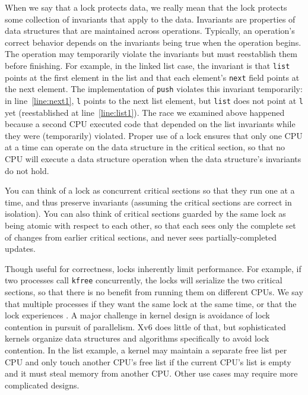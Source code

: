 When we say that a lock protects data, we really mean
that the lock protects some collection of invariants
that apply to the data.
Invariants are properties of data structures that
are maintained across operations.
Typically, an operation's correct behavior depends
on the invariants being true when the operation
begins.  The operation may temporarily violate
the invariants but must reestablish them before
finishing.
For example, in the linked list case, the invariant is that
\lstinline{list}
points at the first element in the list
and that each element's
\lstinline{next}
field points at the next element.
The implementation of
\lstinline{push}
violates this invariant temporarily: in line~\ref{line:next1},
\lstinline{l}
points
to the next list element, but
\lstinline{list}
does not point at
\lstinline{l}
yet (reestablished at line~\ref{line:list1}).
The race we examined above
happened because a second CPU executed
code that depended on the list invariants
while they were (temporarily) violated.
Proper use of a lock ensures that only one CPU at a time
can operate on the data structure in the critical section, so that
no CPU will execute a data structure operation when the 
data structure's invariants do not hold.

You can think of a lock as
concurrent critical sections so that they run one at a time,
and thus preserve invariants (assuming the critical sections
are correct in isolation).
You can also think of critical sections guarded by the same lock as being
atomic with respect to each other,
so that each sees only the complete set of
changes from earlier critical sections, and never sees
partially-completed updates.

Though useful for correctness, locks inherently
limit performance.  For example, if two processes call {\tt kfree}
concurrently, the locks will serialize the two critical sections,
so that there is no
benefit from running them on different CPUs.  We say that multiple
processes  if they want the same lock at the same
time, or that the lock experiences .  A major
challenge in kernel design is avoidance of lock contention
in pursuit of parallelism.  Xv6 does
little of that, but sophisticated kernels organize
data structures and algorithms specifically to avoid lock contention.  In the list
example, a kernel may maintain a separate free list per CPU and only touch
another CPU's free list if the current CPU's list is empty and it must steal
memory from another CPU.  Other use cases may require more
complicated designs.

